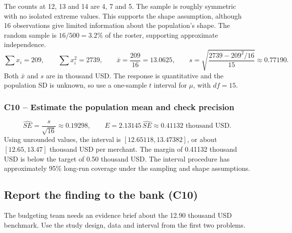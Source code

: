 	The counts at 12, 13 and 14 are 4, 7 and 5. The sample is roughly symmetric with no isolated extreme values. This supports the shape assumption, although 16 observations give limited information about the population's shape. The random sample is $16/500=3.2\%$ of the roster, supporting approximate independence.
	\[
	\sum x_i=209,\qquad \sum x_i^2=2739,\qquad
	\bar x=\frac{209}{16}=13.0625,\qquad
	s=\sqrt{\frac{2739-209^2/16}{15}}\approx0.77190.
	\]
	Both $\bar x$ and $s$ are in thousand USD. The response is quantitative and the population SD is unknown, so use a one-sample $t$ interval for $\mu$, with $df=15$.


	\label{sol:c10-2-b}
	\subsubsection*{C10 -- Estimate the population mean and check precision}

	\[
	\widehat{SE}=\frac{s}{\sqrt{16}}\approx0.19298,\qquad
	E=2.13145\,\widehat{SE}\approx0.41132\text{ thousand USD}.
	\]
	Using unrounded values, the interval is $[12.65118,13.47382]$, or about $[12.65,13.47]$ thousand USD per merchant. The margin of 0.41132 thousand USD is below the target of 0.50 thousand USD. The interval procedure has approximately 95\% long-run coverage under the sampling and shape assumptions.


	\clearpage

	\subsection{Report the finding to the bank (C10)}
	\label{prob:c10-3}

	The budgeting team needs an evidence brief about the 12.90 thousand USD benchmark. Use the study design, data and interval from the first two problems.


